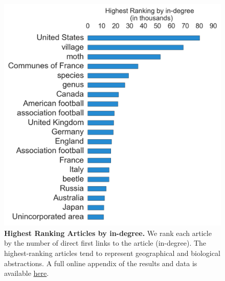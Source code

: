 \documentclass[pre,twocolumn,twoside,superscriptaddress,floatfix]{revtex4-1}
\begin{document}
{\begin{figure}[tp!]
  \includegraphics[width=\columnwidth]{articles_ndegree.pdf}
  \caption{
    \textbf{Highest Ranking Articles by in-degree.}
    We rank each article by the number of direct first links to the article (in-degree). The highest-ranking articles tend to represent geographical and biological abstractions. A full online appendix of the results and data is available \href{http://compstorylab.org/share/papers/ibrahim2016a/index.html}{here}.}
  \label{fig:indegree list}
\end{figure}

}
\end{document}
